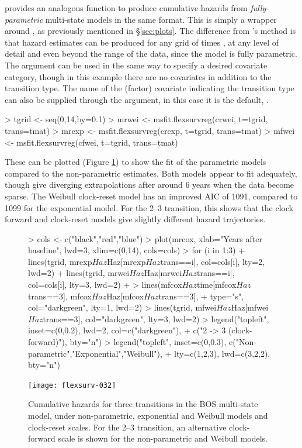 \documentclass[nojss,nofooter]{jss}
\begin{document}
 provides an analogous function 
to produce cumulative hazards from \emph{fully-parametric} multi-state
models in the same format.  This is simply a wrapper around
, as previously mentioned
in \S\ref{sec:plots}.  The difference from 's method is
that hazard estimates can be produced for any grid of times ,
at any level of detail and even beyond the range of the data, since
the model is fully parametric. The argument  can be used
in the same way to specify a desired covariate category, though in
this example there are no covariates in addition to the transition
type.  The name of the (factor) covariate indicating the transition
type can also be supplied through the  argument, in this
case it is the default, .
\begin{Schunk}
\begin{Sinput}
> tgrid <- seq(0,14,by=0.1)
> mrwei <- msfit.flexsurvreg(crwei, t=tgrid, trans=tmat)
> mrexp <- msfit.flexsurvreg(crexp, t=tgrid, trans=tmat)
> mfwei <- msfit.flexsurvreg(cfwei, t=tgrid, trans=tmat)
\end{Sinput}
\end{Schunk}
These can be plotted (Figure \ref{fig:bos:cumhaz}) to show the fit of
the parametric models compared to the non-parametric estimates.  Both
models appear to fit adequately, though give diverging extrapolations
after around 6 years when the data become sparse.  The Weibull
clock-reset model has an improved AIC of 1091, compared to
1099 for the exponential model.  For the 2--3 transition,
this shows that the clock forward and clock-reset models give slightly
different hazard trajectories.
\begin{figure}
\begin{Schunk}
\begin{Sinput}
> cols <- c("black","red","blue")
> plot(mrcox, xlab="Years after baseline", lwd=3, xlim=c(0,14), cols=cols)
> for (i in 1:3){
+     lines(tgrid, mrexp$Haz$Haz[mrexp$Haz$trans==i], col=cols[i], lty=2, lwd=2)
+     lines(tgrid, mrwei$Haz$Haz[mrwei$Haz$trans==i], col=cols[i], lty=3, lwd=2)
+ }
> lines(mfcox$Haz$time[mfcox$Haz$trans==3], mfcox$Haz$Haz[mfcox$Haz$trans==3],
+       type="s", col="darkgreen", lty=1, lwd=2)
> lines(tgrid, mfwei$Haz$Haz[mfwei$Haz$trans==3], col="darkgreen", lty=3, lwd=2)
> legend("topleft", inset=c(0,0.2), lwd=2, col=c("darkgreen"), 
+        c("2 -> 3 (clock-forward)"), bty="n")
> legend("topleft", inset=c(0,0.3), c("Non-parametric","Exponential","Weibull"),
+        lty=c(1,2,3), lwd=c(3,2,2), bty="n")
\end{Sinput}
\end{Schunk}
\texttt{[image: flexsurv-032]}
\caption{Cumulative hazards for three transitions in the BOS multi-state model, under non-parametric, exponential and Weibull models and clock-reset scales.  For the 2--3 transition, an alternative clock-forward scale is shown for the non-parametric and Weibull models.} 
\label{fig:bos:cumhaz}
\end{figure}
\end{document}
